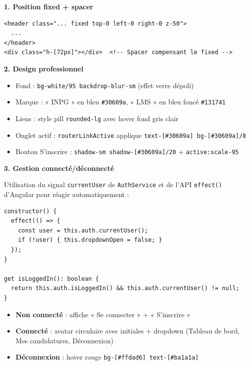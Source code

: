 \documentclass[a4paper,12pt,french]{article}
\begin{document}
\begin{solutionbox}
\textbf{1. Position fixed + spacer}

\begin{lstlisting}[style=htmlstyle]
<header class="... fixed top-0 left-0 right-0 z-50">
  ...
</header>
<div class="h-[72px]"></div>  <!-- Spacer compensant le fixed -->
\end{lstlisting}

\textbf{2. Design professionnel}
\begin{itemize}
    \item Fond : \texttt{bg-white/95 backdrop-blur-sm} (effet verre dépoli)
    \item Marque : « INPG » en bleu \texttt{\#30609a}, « LMS » en bleu foncé \texttt{\#131741}
    \item Liens : style pill \texttt{rounded-lg} avec hover fond gris clair
    \item Onglet actif : \texttt{routerLinkActive} applique \texttt{text-[\#30609a] bg-[\#30609a]/8}
    \item Bouton S'inscrire : \texttt{shadow-sm shadow-[\#30609a]/20} + \texttt{active:scale-95}
\end{itemize}

\textbf{3. Gestion connecté/déconnecté}

Utilisation du signal \texttt{currentUser} de \texttt{AuthService} et de l'API \texttt{effect()} d'Angular pour réagir automatiquement :

\begin{lstlisting}[style=tsstyle]
constructor() {
  effect(() => {
    const user = this.auth.currentUser();
    if (!user) { this.dropdownOpen = false; }
  });
}

get isLoggedIn(): boolean {
  return this.auth.isLoggedIn() && this.auth.currentUser() != null;
}
\end{lstlisting}

\begin{itemize}
    \item \textbf{Non connecté} : affiche « Se connecter » + « S'inscrire »
    \item \textbf{Connecté} : avatar circulaire avec initiales + dropdown (Tableau de bord, Mes candidatures, Déconnexion)
    \item \textbf{Déconnexion} : hover rouge \texttt{bg-[\#ffdad6] text-[\#ba1a1a]}
\end{itemize}
\end{solutionbox}
\end{document}
